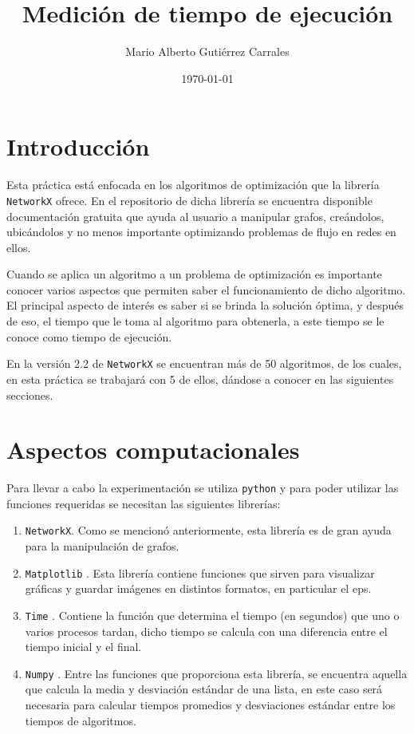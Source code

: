 \documentclass[12pt]{article}
\title{\huge{\textbf{Medición de tiempo de ejecución}}}
\author{Mario Alberto Gutiérrez Carrales}
\date{\today}
\begin{document}
\maketitle

\section*{Introducción}
Esta práctica está enfocada en los algoritmos de optimización que la librería \texttt{NetworkX} \cite{Net} ofrece. En el repositorio de dicha librería se encuentra disponible documentación gratuita que ayuda al usuario a manipular grafos, creándolos, ubicándolos y no menos importante optimizando problemas de flujo en redes en ellos.

Cuando se aplica un algoritmo a un problema de optimización es importante conocer varios aspectos que permiten saber el funcionamiento de dicho algoritmo. El principal aspecto de interés es saber si se brinda la solución óptima, y después de eso, el tiempo que le toma al algoritmo para obtenerla, a este tiempo se le conoce como tiempo de ejecución. 

En la versión 2.2 de \texttt{NetworkX} se encuentran más de 50 algoritmos, de los cuales, en esta práctica se trabajará con 5 de ellos, dándose a conocer en las siguientes secciones.

\newpage
\section*{Aspectos computacionales}
Para llevar a cabo la experimentación se utiliza \texttt{python} \cite{Python} y para poder utilizar las funciones requeridas se necesitan las siguientes librerías:

\begin{enumerate}
\item \texttt{NetworkX}. Como se mencionó anteriormente, esta librería es de gran ayuda para la manipulación de grafos.

\item \texttt{Matplotlib} \cite{Mat}. Esta librería contiene funciones que sirven para visualizar gráficas y guardar imágenes en distintos formatos, en particular el eps.
 
\item \texttt{Time} \cite{PythonHow}. Contiene la función que determina el tiempo (en segundos) que uno o varios procesos tardan, dicho tiempo se calcula con una diferencia entre el tiempo inicial y el final.

\item \texttt{Numpy} \cite{Num}. Entre las funciones que proporciona esta librería, se encuentra aquella que calcula la media y desviación estándar de una lista, en este caso será necesaria para calcular tiempos promedios y desviaciones estándar entre los tiempos de algoritmos. 
\end{enumerate}
\end{document}
